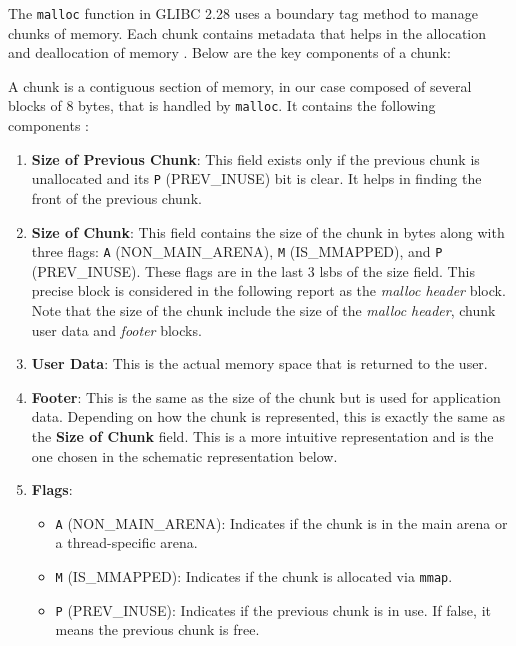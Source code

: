     The \texttt{malloc} function in GLIBC 2.28 uses a boundary tag method to manage chunks of memory. Each chunk contains metadata that helps in the allocation and deallocation of memory \cite{MallocGLIBC2001} \cite{MallocInternalsWiki2023}. Below are the key components of a chunk:

    A chunk is a contiguous section of memory, in our case composed of several blocks of 8 bytes, that is handled by \texttt{malloc}. It contains the following components \cite{MallocInternalsWiki2023} \cite{StackExchangeMalloc2023}:

    \begin{enumerate}
        \item \textbf{Size of Previous Chunk}: This field exists only if the previous chunk is unallocated and its \texttt{P} (PREV\_INUSE) bit is clear. It helps in finding the front of the previous chunk.
        
        \item \textbf{Size of Chunk}: This field contains the size of the chunk in bytes along with three flags: \texttt{A} (NON\_MAIN\_ARENA), \texttt{M} (IS\_MMAPPED), and \texttt{P} (PREV\_INUSE). These flags are in the last 3 \acrshort{lsb}s of the size field. This precise block is considered in the following report as the \textit{malloc header} block. Note that the size of the chunk include the size of the \textit{malloc header}, chunk user data and \textit{footer} blocks.
        
        \item \textbf{User Data}: This is the actual memory space that is returned to the user.
        
        \item \textbf{Footer}: This is the same as the size of the chunk but is used for application data. Depending on how the chunk is represented, this is exactly the same as the \textbf{Size of Chunk} field. This is a more intuitive representation and is the one chosen in the schematic representation below.
        
        \item \textbf{Flags}:
        \begin{itemize}
            \item \texttt{A} (NON\_MAIN\_ARENA): Indicates if the chunk is in the main arena or a thread-specific arena.
            \item \texttt{M} (IS\_MMAPPED): Indicates if the chunk is allocated via \texttt{mmap}.
            \item \texttt{P} (PREV\_INUSE): Indicates if the previous chunk is in use. If false, it means the previous chunk is free.
        \end{itemize}
    \end{enumerate}

